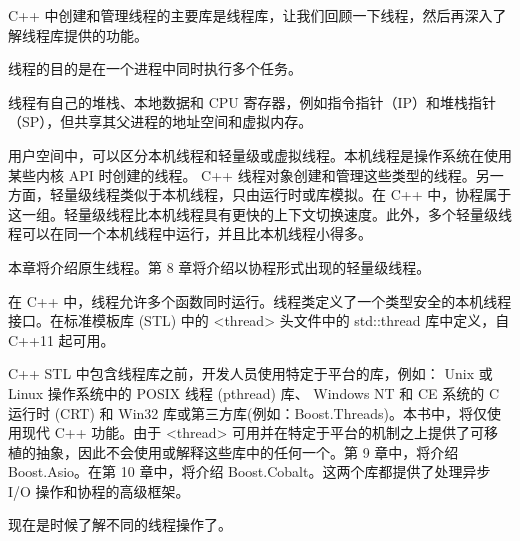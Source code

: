 
C++ 中创建和管理线程的主要库是线程库，让我们回顾一下线程，然后再深入了解线程库提供的功能。


线程的目的是在一个进程中同时执行多个任务。

线程有自己的堆栈、本地数据和 CPU 寄存器，例如指令指针（IP）和堆栈指针（SP），但共享其父进程的地址空间和虚拟内存。

用户空间中，可以区分本机线程和轻量级或虚拟线程。本机线程是操作系统在使用某些内核 API 时创建的线程。 C++ 线程对象创建和管理这些类型的线程。另一方面，轻量级线程类似于本机线程，只由运行时或库模拟。在 C++ 中，协程属于这一组。轻量级线程比本机线程具有更快的上下文切换速度。此外，多个轻量级线程可以在同一个本机线程中运行，并且比本机线程小得多。

本章将介绍原生线程。第 8 章将介绍以协程形式出现的轻量级线程。


在 C++ 中，线程允许多个函数同时运行。线程类定义了一个类型安全的本机线程接口。在标准模板库 (STL) 中的 <thread> 头文件中的 std::thread 库中定义，自 C++11 起可用。

C++ STL 中包含线程库之前，开发人员使用特定于平台的库，例如： Unix 或 Linux 操作系统中的 POSIX 线程 (pthread) 库、 Windows NT 和 CE 系统的 C 运行时 (CRT) 和 Win32 库或第三方库(例如：Boost.Threads)。本书中，将仅使用现代 C++ 功能。由于 <thread> 可用并在特定于平台的机制之上提供了可移植的抽象，因此不会使用或解释这些库中的任何一个。第 9 章中，将介绍 Boost.Asio。在第 10 章中，将介绍 Boost.Cobalt。这两个库都提供了处理异步 I/O 操作和协程的高级框架。

现在是时候了解不同的线程操作了。
